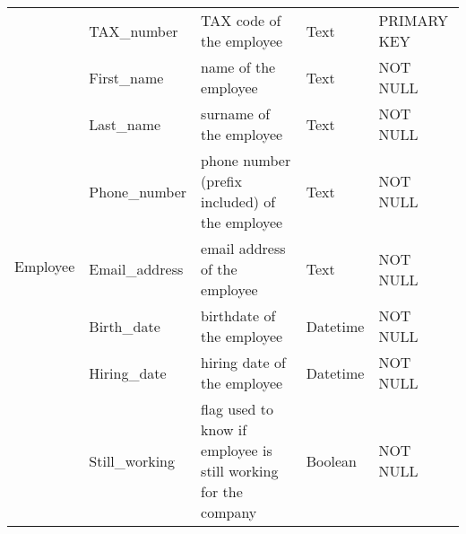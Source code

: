 \begin{longtable}{|p{}|p{} |p{}|p{}|p{} |}
\multirow{8}{*}{Employee} & TAX\_number & TAX code of the employee & Text &  PRIMARY KEY\\\cline{2-5}
& First\_name & name of the employee & Text & NOT NULL \\\cline{2-5}
& Last\_name & surname of the employee  & Text & NOT NULL \\\cline{2-5} 
& Phone\_number & phone number (prefix included) of the employee & Text & NOT NULL \\\cline{2-5} 
& Email\_address & email address of the employee & Text & NOT NULL \\\cline{2-5} 
& Birth\_date & birthdate of the employee  & Datetime & NOT NULL \\\cline{2-5} 
& Hiring\_date & hiring date of the employee & Datetime & NOT NULL \\\cline{2-5} 
& Still\_working & flag used to know if employee is still working for the company & Boolean & NOT NULL \\\hline

\end{longtable}